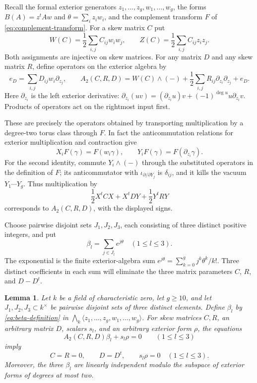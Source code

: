 \documentclass[11pt]{article}
\numberwithin{equation}{section}
\newtheorem{lemma}[theorem]{Lemma}
\theoremstyle{definition}
\theoremstyle{remark}
\begin{document}
Recall the formal exterior generators $z_1,\ldots,z_g,w_1,\ldots,w_g$,
the forms $B(A)=z^tAw$ and $\theta=\sum_i z_iw_i$, and the complement
transform $F$ of \eqref{eq:complement-transform}.
For a skew matrix $C$ put
\[
 W(C)=\frac12\sum_{i,j}C_{ij}w_iw_j,\qquad
 Z(C)=\frac12\sum_{i,j}C_{ij}z_iz_j.
\]
Both assignments are injective on skew matrices.  For any matrix $D$
and any skew matrix $R$, define operators on the exterior algebra by
\begin{equation}\label{eq:exterior-operators}
 e_D=\sum_{i,j}D_{ij}w_i\partial_{z_j},\qquad
 A_2(C,R,D)=W(C)\wedge(-)
       +\frac12\sum_{i,j}R_{ij}\partial_{z_i}\partial_{z_j}+e_D.
\end{equation}
Here $\partial_{z_i}$ is the left exterior derivative:
$\partial_{z_i}(uv)=(\partial_{z_i}u)v+(-1)^{\deg u}u\partial_{z_i}v$.
Products of operators act on the rightmost input first.

These are precisely the operators obtained by transporting multiplication
by a degree-two torus class through $F$.  In fact the anticommutation
relations for exterior multiplication and contraction give
\[
 X_iF(\gamma)=F(w_i\gamma),\qquad
 Y_iF(\gamma)=F(\partial_{z_i}\gamma).
\]
For the second identity, commute $Y_i\wedge(-)$ through the substituted
operators in the definition of $F$; its anticommutator with
$\iota_{\partial/\partial Y_j}$ is $\delta_{ij}$, and it kills the
vacuum $Y_1\cdots Y_g$.  Thus multiplication by
\begin{equation}\label{eq:torus-general-degree-two}
 \frac12X^tCX+X^tDY+\frac12Y^tRY
\end{equation}
corresponds to $A_2(C,R,D)$, with the displayed signs.

Choose pairwise disjoint sets $J_1,J_2,J_3$, each consisting of three
distinct positive integers, and put
\begin{equation}\label{eq:beta-definition}
 \beta_l=\sum_{j\in J_l}e^{j\theta}\quad(1\le l\le3).
\end{equation}
The exponential is the finite exterior-algebra sum
$e^{j\theta}=\sum_{k=0}^g j^k\theta^k/k!$.
Three distinct coefficients in each sum will eliminate the three
matrix parameters $C$, $R$, and $D-D^t$.

\begin{lemma}\label{lem:exponential-elimination}
Let $k$ be a field of characteristic zero, let $g\ge10$, and let
$J_1,J_2,J_3\subset k^\times$ be pairwise disjoint sets of three
distinct elements.  Define $\beta_l$ by \eqref{eq:beta-definition} in
$\bigwedge_k\langle z_1,\ldots,z_g,w_1,\ldots,w_g\rangle$.
For skew matrices $C,R$, an arbitrary matrix $D$, scalars $s_l$, and
an arbitrary exterior form $\rho$, the equations
\begin{equation}\label{eq:exponential-elimination-system}
 A_2(C,R,D)\beta_l+s_l\rho=0\qquad(1\le l\le3)
\end{equation}
imply
\[
 C=R=0,\qquad D=D^t,\qquad s_l\rho=0\quad(1\le l\le3).
\]
Moreover, the three $\beta_l$ are linearly independent modulo the
subspace of exterior forms of degrees at most two.
\end{lemma}
\end{document}
